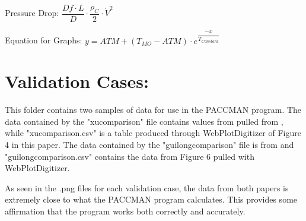 \documentclass[a4paper,12pt]{article}
\begin{document}
\medskip

Pressure Drop: $\dfrac{Df \cdot L}{D} \cdot \dfrac{\rho_{C}}{2} \cdot \dot{V}^{2}$

\medskip

Equation for Graphs: $y = ATM + (T_{MO} - ATM) \cdot e^{\dfrac{-x}{T_{Constant}}}$

\clearpage

\section*{Validation Cases:}

This folder contains two samples of data for use in the PACCMAN program.
The data contained by the "xucomparison" file contains values from pulled from \cite{XU2001}, while "xucomparison.csv" is a table produced through WebPlotDigitizer of Figure 4 in this  paper.
The data contained by the "guilongcomparison" file is from \cite{GUILONG2010} and "guilongcomparison.csv" contains the data from Figure 6 pulled with WebPlotDigitizer. 

\medskip

As seen in the .png files for each validation case, the data from both papers is extremely close to what the PACCMAN program calculates. This provides some affirmation that the program works both correctly and accurately.

\clearpage

\nocite{*} 

\end{document}
